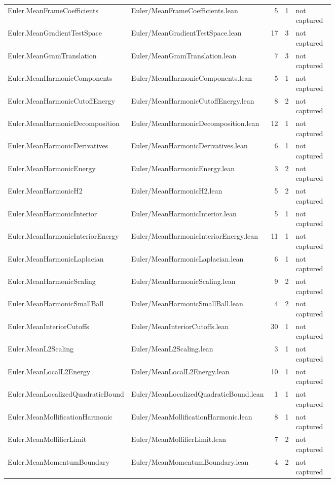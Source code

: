 \documentclass[10pt]{article}
\begin{document}
\begin{longtable}{p{0.28\linewidth}p{0.27\linewidth}r r p{0.20\linewidth}}
Euler.MeanFrameCoefficients & Euler/MeanFrameCoefficients.lean & 5 & 1 & not captured\\
Euler.MeanGradientTestSpace & Euler/MeanGradientTestSpace.lean & 17 & 3 & not captured\\
Euler.MeanGramTranslation & Euler/MeanGramTranslation.lean & 7 & 3 & not captured\\
Euler.MeanHarmonicComponents & Euler/MeanHarmonicComponents.lean & 5 & 1 & not captured\\
Euler.MeanHarmonicCutoffEnergy & Euler/MeanHarmonicCutoffEnergy.lean & 8 & 2 & not captured\\
Euler.MeanHarmonicDecomposition & Euler/MeanHarmonicDecomposition.lean & 12 & 1 & not captured\\
Euler.MeanHarmonicDerivatives & Euler/MeanHarmonicDerivatives.lean & 6 & 1 & not captured\\
Euler.MeanHarmonicEnergy & Euler/MeanHarmonicEnergy.lean & 3 & 2 & not captured\\
Euler.MeanHarmonicH2 & Euler/MeanHarmonicH2.lean & 5 & 2 & not captured\\
Euler.MeanHarmonicInterior & Euler/MeanHarmonicInterior.lean & 5 & 1 & not captured\\
Euler.MeanHarmonicInteriorEnergy & Euler/MeanHarmonicInteriorEnergy.lean & 11 & 1 & not captured\\
Euler.MeanHarmonicLaplacian & Euler/MeanHarmonicLaplacian.lean & 6 & 1 & not captured\\
Euler.MeanHarmonicScaling & Euler/MeanHarmonicScaling.lean & 9 & 2 & not captured\\
Euler.MeanHarmonicSmallBall & Euler/MeanHarmonicSmallBall.lean & 4 & 2 & not captured\\
Euler.MeanInteriorCutoffs & Euler/MeanInteriorCutoffs.lean & 30 & 1 & not captured\\
Euler.MeanL2Scaling & Euler/MeanL2Scaling.lean & 3 & 1 & not captured\\
Euler.MeanLocalL2Energy & Euler/MeanLocalL2Energy.lean & 10 & 1 & not captured\\
Euler.MeanLocalizedQuadraticBound & Euler/MeanLocalizedQuadraticBound.lean & 1 & 1 & not captured\\
Euler.MeanMollificationHarmonic & Euler/MeanMollificationHarmonic.lean & 8 & 1 & not captured\\
Euler.MeanMollifierLimit & Euler/MeanMollifierLimit.lean & 7 & 2 & not captured\\
Euler.MeanMomentumBoundary & Euler/MeanMomentumBoundary.lean & 4 & 2 & not captured\\

\end{longtable}
\end{document}
